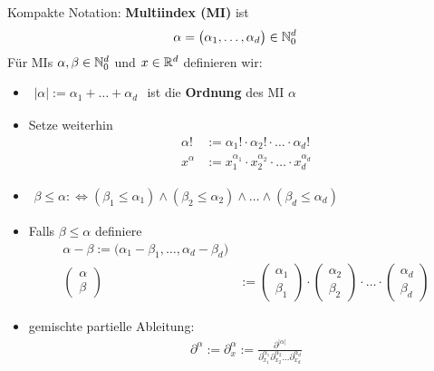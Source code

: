 \begin{notation}
	Kompakte Notation: \textbf{Multiindex (MI)} ist
	\begin{align*}
		\alpha=\big(\alpha_1,\ldots,\alpha_d\big)\in\mathbb{N}_0^d
	\end{align*}
	Für MIs $\alpha,\beta\in\mathbb{N}_0^d$ und $x\in\mathbb{R}^d$ definieren wir:
	\begin{itemize}
		\item $\begin{aligned}
			|\alpha|:=\alpha_1+\ldots+\alpha_d
		\end{aligned}$ ist die \textbf{Ordnung} des MI $\alpha$
		\item Setze weiterhin
		\begin{align*}
			\alpha!&:=\alpha_1!\cdot\alpha_2!\cdot\ldots\cdot\alpha_d!\\
			x^\alpha&:=x_1^{\alpha_1}\cdot x_2^{\alpha_2}\cdot\ldots\cdot x_d^{\alpha_d}
		\end{align*}
		\item $\begin{aligned}
			\beta\leq\alpha:\Longleftrightarrow(\beta_1\leq\alpha_1)\wedge(\beta_2\leq\alpha_2)\wedge\ldots\wedge(\beta_d\leq\alpha_d)
		\end{aligned}$ 
		\item Falls $\beta\leq\alpha$ definiere
		\begin{align*}
			\alpha-\beta:=\big(\alpha_1-\beta_1,\ldots,\alpha_d-\beta_d\big)\\
			\begin{pmatrix}
				\alpha\\\beta
			\end{pmatrix}&:=\begin{pmatrix}
				\alpha_1\\\beta_1
			\end{pmatrix}\cdot\begin{pmatrix}
				\alpha_2\\\beta_2
			\end{pmatrix}\cdot\ldots\cdot\begin{pmatrix}
				\alpha_d\\\beta_d
			\end{pmatrix}
		\end{align*}
		\item gemischte partielle Ableitung:
		\begin{align*}
			\partial^\alpha:=\partial_x^\alpha:=\frac{\partial^{|\alpha|}}{\partial_{x_1}^{\alpha_1}\partial_{x_2}^{\alpha_2}\ldots\partial_{x_d}^{\alpha_d}}
		\end{align*}
	\end{itemize}
\end{notation}

